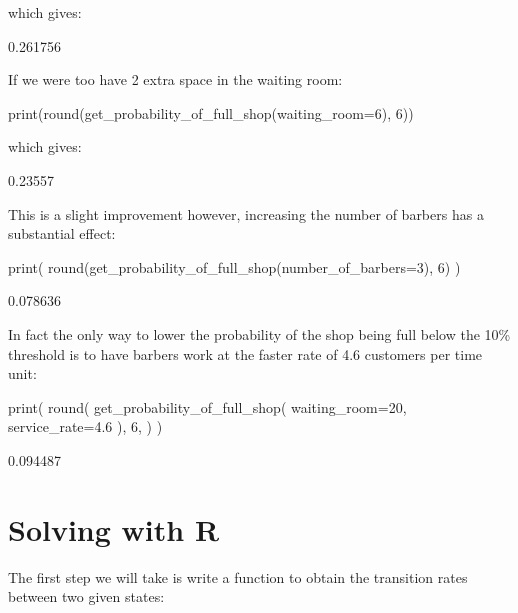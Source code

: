 which gives:

\begin{pyout}
0.261756
\end{pyout}

If we were too have 2 extra space in the waiting room:

\begin{pyin}
print(round(get_probability_of_full_shop(waiting_room=6), 6))
\end{pyin}

which gives:

\begin{pyout}
0.23557
\end{pyout}

This is a slight improvement however, increasing the number of barbers has a
substantial effect:

\begin{pyin}
print(
    round(get_probability_of_full_shop(number_of_barbers=3), 6)
)
\end{pyin}

\begin{pyout}
0.078636
\end{pyout}

In fact the only way to lower the probability of the shop being full below the
10\% threshold is to have barbers work at the faster rate of 4.6 customers per
time unit:

\begin{pyin}
print(
    round(
        get_probability_of_full_shop(
            waiting_room=20, service_rate=4.6
        ),
        6,
    )
)
\end{pyin}

\begin{pyout}
0.094487
\end{pyout}


\section{Solving with R}\label{sec:solving-with-R}

The first step we will take is write a function to obtain the transition rates
between two given states:

